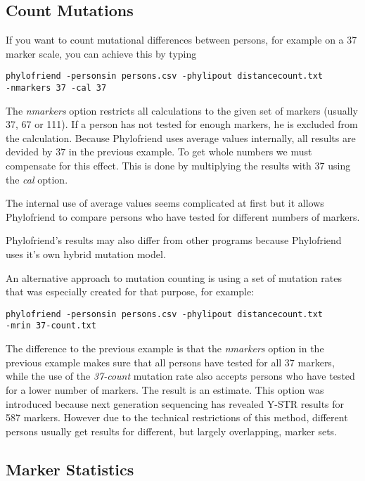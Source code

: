 \subsection{Count Mutations}

If you want to count mutational differences between
persons, for example on a 37 marker scale, you can
achieve this by typing

\noindent\texttt{phylofriend -personsin persons.csv -phylipout distancecount.txt\\
-nmarkers 37 -cal 37}

The \emph{nmarkers} option restricts all calculations
to the given set of markers (usually 37, 67 or 111). If
a person has not tested for enough markers, he is excluded
from the calculation. Because Phylofriend uses average
values internally, all results are devided by 37 in 
the previous example. To get whole numbers we must compensate
for this effect. This is done by multiplying the results
with 37 using the \emph{cal} option.

The internal use of average values seems complicated at
first but it allows Phylofriend to compare persons who
have tested for different numbers of markers.

Phylofriend's results may also differ from other programs
because Phylo\-friend uses it's own hybrid mutation model.

An alternative approach to mutation counting is using a set
of mutation rates that was especially created for that purpose,
for example:

\noindent\texttt{phylofriend -personsin persons.csv -phylipout distancecount.txt\\
-mrin 37-count.txt}

The difference to the previous example is that the \emph{nmarkers}
option in the previous example makes sure that all persons
have tested for all 37 markers, while the use of the
\emph{37-count} mutation rate also accepts persons who have
tested for a lower number of markers. The result is an estimate.
This option was introduced because next generation sequencing
has revealed Y-STR results for 587 markers. However due to
the technical restrictions of this method, different persons
usually get results for different, but largely overlapping,
marker sets.


\subsection{Marker Statistics}


